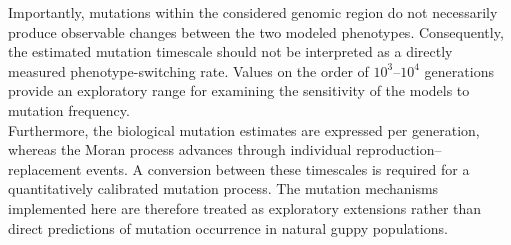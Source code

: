 Importantly, mutations within the considered genomic region do not necessarily produce observable changes between the two modeled phenotypes. Consequently, the estimated mutation timescale should not be interpreted as a directly measured phenotype-switching rate. Values on the order of $10^3$--$10^4$ generations provide an exploratory range for examining the sensitivity of the models to mutation frequency. \\ 

Furthermore, the biological mutation estimates are expressed per generation, whereas the Moran process advances through individual reproduction--replacement events. A conversion between these timescales is required for a quantitatively calibrated mutation process. The mutation mechanisms implemented here are therefore treated as exploratory extensions rather than direct predictions of mutation occurrence in natural guppy populations.

